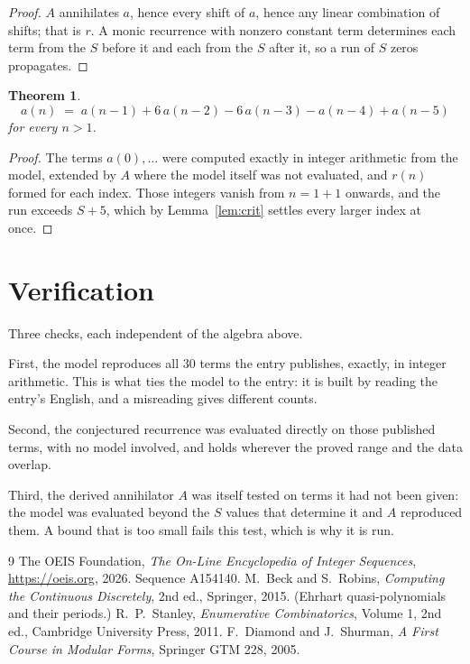 \documentclass[11pt,a4paper]{article}
\theoremstyle{plain}
\newtheorem{theorem}{Theorem}
\theoremstyle{definition}
\begin{document}
\begin{proof}
$A$ annihilates $a$, hence every shift of $a$, hence any linear combination of shifts; that is
$r$. A monic recurrence with nonzero constant term determines each term from the $S$ before it
and each from the $S$ after it, so a run of $S$ zeros propagates.
\end{proof}

\begin{theorem}
\[
a(n)\;=\;a(n-1) + 6\,a(n-2) - 6\,a(n-3) - a(n-4) + a(n-5)
\]
for every $n>1$.
\end{theorem}

\begin{proof}
The terms $a(0),\dots$ were computed exactly in integer arithmetic from the model, extended by
$A$ where the model itself was not evaluated, and $r(n)$ formed for each index. Those integers
vanish from $n=1+1$ onwards, and the run exceeds $S+5$, which by
Lemma~\ref{lem:crit} settles every larger index at once.
\end{proof}

\section{Verification}

Three checks, each independent of the algebra above.

First, the model reproduces all $30$ terms the entry publishes, exactly, in integer
arithmetic. This is what ties the model to the entry: it is built by reading the entry's
English, and a misreading gives different counts.

Second, the conjectured recurrence was evaluated directly on those published terms, with no
model involved, and holds wherever the proved range and the data overlap.

Third, the derived annihilator $A$ was itself tested on terms it had not been given: the model
was evaluated beyond the $S$ values that determine it and $A$ reproduced them. A bound that is
too small fails this test, which is why it is run.

\begin{thebibliography}{9}
 The OEIS Foundation, \emph{The On-Line Encyclopedia of Integer
Sequences}, \url{https://oeis.org}, 2026. Sequence A154140.
 M.~Beck and S.~Robins, \emph{Computing the Continuous Discretely},
2nd ed., Springer, 2015. (Ehrhart quasi-polynomials and their periods.)
 R.~P.~Stanley, \emph{Enumerative Combinatorics}, Volume 1, 2nd ed.,
Cambridge University Press, 2011.
 F.~Diamond and J.~Shurman, \emph{A First Course in Modular Forms},
Springer GTM 228, 2005.
\end{thebibliography}
\end{document}
